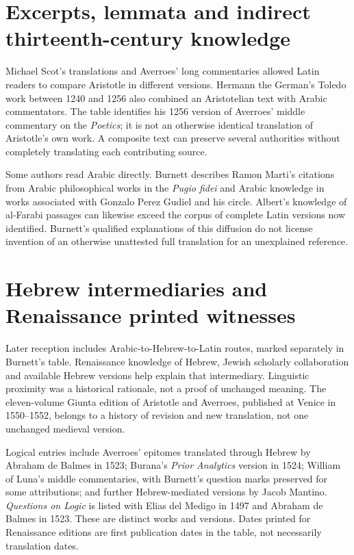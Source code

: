 \section{Excerpts, lemmata and indirect thirteenth-century knowledge}
\label{sec:p13-arabic-latin-thirteenth-century}

Michael Scot's translations and Averroes' long commentaries
allowed Latin readers to compare Aristotle in different versions.
Hermann the German's Toledo work between 1240 and 1256 also
combined an Aristotelian text with Arabic commentators. The
table identifies his 1256 version of Averroes' middle commentary
on the \emph{Poetics}; it is not an otherwise identical translation
of Aristotle's own work. A composite text can preserve several
authorities without completely translating each contributing source.
\cite[pp.~374--375, 380--382, 397]{Burnett2005ArabicLatinSupplement}

Some authors read Arabic directly. Burnett describes Ramon
Marti's citations from Arabic philosophical works in the
\emph{Pugio fidei} and Arabic knowledge in works associated
with Gonzalo Perez Gudiel and his circle. Albert's knowledge
of al-Farabi passages can likewise exceed the corpus of complete
Latin versions now identified. Burnett's qualified explanations
of this diffusion do not license invention of an otherwise
unattested full translation for an unexplained reference.
\cite[pp.~381--383]{Burnett2005ArabicLatinSupplement}

\section{Hebrew intermediaries and Renaissance printed witnesses}
\label{sec:p13-arabic-latin-hebrew-renaissance}

Later reception includes Arabic-to-Hebrew-to-Latin routes,
marked separately in Burnett's table. Renaissance knowledge
of Hebrew, Jewish scholarly collaboration and available Hebrew
versions help explain that intermediary. Linguistic proximity
was a historical rationale, not a proof of unchanged meaning.
The eleven-volume Giunta edition of Aristotle and Averroes,
published at Venice in 1550--1552, belongs to a history of
revision and new translation, not one unchanged medieval version.
\cite[pp.~385--386, 391]{Burnett2005ArabicLatinSupplement}

Logical entries include Averroes' epitomes translated through
Hebrew by Abraham de Balmes in 1523; Burana's \emph{Prior
Analytics} version in 1524; William of Luna's middle commentaries,
with Burnett's question marks preserved for some attributions;
and further Hebrew-mediated versions by Jacob Mantino.
\emph{Questions on Logic} is listed with Elias del Medigo in
1497 and Abraham de Balmes in 1523. These are distinct works
and versions. Dates printed for Renaissance editions are first
publication dates in the table, not necessarily translation dates.
\cite[pp.~391, 397--399]{Burnett2005ArabicLatinSupplement}

